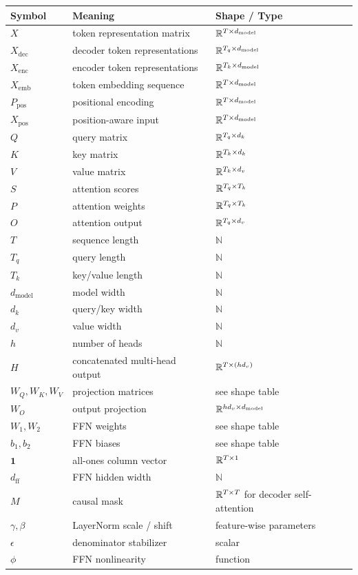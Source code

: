 \begin{center}
\begin{tabular}{lll}
\toprule
Symbol & Meaning & Shape / Type \\
\midrule
$X$ & token representation matrix & $\mathbb{R}^{T \times d_{\mathrm{model}}}$ \\
$X_{\mathrm{dec}}$ & decoder token representations & $\mathbb{R}^{T_q \times d_{\mathrm{model}}}$ \\
$X_{\mathrm{enc}}$ & encoder token representations & $\mathbb{R}^{T_k \times d_{\mathrm{model}}}$ \\
$X_{\mathrm{emb}}$ & token embedding sequence & $\mathbb{R}^{T \times d_{\mathrm{model}}}$ \\
$P_{\mathrm{pos}}$ & positional encoding & $\mathbb{R}^{T \times d_{\mathrm{model}}}$ \\
$X_{\mathrm{pos}}$ & position-aware input & $\mathbb{R}^{T \times d_{\mathrm{model}}}$ \\
$Q$ & query matrix & $\mathbb{R}^{T_q \times d_k}$ \\
$K$ & key matrix & $\mathbb{R}^{T_k \times d_k}$ \\
$V$ & value matrix & $\mathbb{R}^{T_k \times d_v}$ \\
$S$ & attention scores & $\mathbb{R}^{T_q \times T_k}$ \\
$P$ & attention weights & $\mathbb{R}^{T_q \times T_k}$ \\
$O$ & attention output & $\mathbb{R}^{T_q \times d_v}$ \\
$T$ & sequence length & $\mathbb{N}$ \\
$T_q$ & query length & $\mathbb{N}$ \\
$T_k$ & key/value length & $\mathbb{N}$ \\
$d_{\mathrm{model}}$ & model width & $\mathbb{N}$ \\
$d_k$ & query/key width & $\mathbb{N}$ \\
$d_v$ & value width & $\mathbb{N}$ \\
$h$ & number of heads & $\mathbb{N}$ \\
$H$ & concatenated multi-head output & $\mathbb{R}^{T \times (h d_v)}$ \\
$W_Q,W_K,W_V$ & projection matrices & see shape table \\
$W_O$ & output projection & $\mathbb{R}^{h d_v \times d_{\mathrm{model}}}$ \\
$W_1,W_2$ & FFN weights & see shape table \\
$b_1,b_2$ & FFN biases & see shape table \\
$\mathbf{1}$ & all-ones column vector & $\mathbb{R}^{T \times 1}$ \\
$d_{\mathrm{ff}}$ & FFN hidden width & $\mathbb{N}$ \\
$M$ & causal mask & $\mathbb{R}^{T \times T}$ for decoder self-attention \\
$\gamma,\beta$ & LayerNorm scale / shift & feature-wise parameters \\
$\epsilon$ & denominator stabilizer & scalar \\
$\phi$ & FFN nonlinearity & function \\
\bottomrule
\end{tabular}
\end{center}
